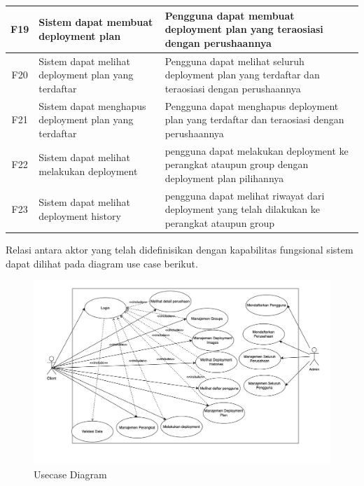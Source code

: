 \begin{table}
\begin{tabular}{|c|p{4.5cm}|p{8cm}|}
    \hline
    F19 & Sistem dapat membuat deployment plan                                           & Pengguna dapat membuat deployment plan yang teraosiasi dengan perushaannya                                 \\
    \hline
    F20 & Sistem dapat melihat deployment plan yang terdaftar                            & Pengguna dapat melihat seluruh deployment plan yang terdaftar dan teraosiasi dengan perushaannya           \\
    \hline
    F21 & Sistem dapat menghapus deployment plan yang terdaftar                          & Pengguna dapat menghapus deployment plan yang terdaftar dan teraosiasi dengan perushaannya                 \\
    \hline
    F22 & Sistem dapat melihat melakukan deployment                                      & pengguna dapat melakukan deployment ke perangkat ataupun group dengan deployment plan pilihannya           \\
    \hline
    F23 & Sistem dapat melihat  deployment history                                       & pengguna dapat melihat riwayat dari deployment yang telah dilakukan ke perangkat ataupun group             \\
    \hline
  \end{tabular}
\end{table}

\pagebreak

Relasi antara aktor yang telah didefinisikan dengan kapabilitas fungsional sistem dapat dilihat pada diagram use case berikut.

\begin{figure}[h]
  \centering
  \includegraphics[width=1\textwidth]{resources/chapter-3/usecase-diagram.jpg}
  \caption{Usecase Diagram}
  \label{fig:usecase-diagram}
\end{figure}